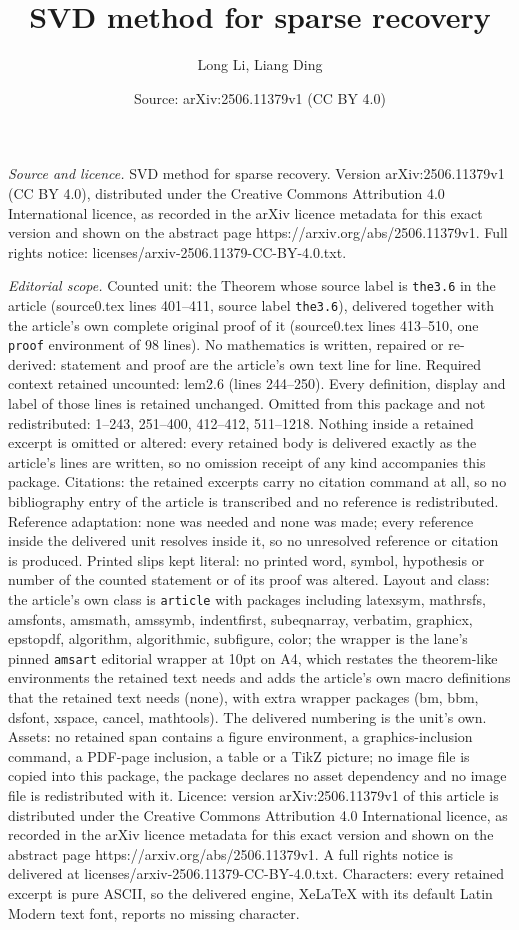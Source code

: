 \documentclass[10pt,a4paper]{amsart}
\title[SVD method for sparse recovery]{SVD method for sparse recovery}
\author{Long Li, Liang Ding}
\date{Source: arXiv:2506.11379v1 (CC BY 4.0)}
\begin{document}
\maketitle

\noindent\emph{Source and licence.} SVD method for sparse recovery. Version arXiv:2506.11379v1 (CC BY 4.0), distributed under the Creative Commons Attribution 4.0 International licence, as recorded in the arXiv licence metadata for this exact version and shown on the abstract page https://arxiv.org/abs/2506.11379v1. Full rights notice: licenses/arxiv-2506.11379-CC-BY-4.0.txt.\par\smallskip

\noindent\textit{Editorial scope.} Counted unit: the Theorem whose source label is \texttt{the3.6} in the article (source0.tex lines 401--411, source label \texttt{the3.6}), delivered together with the article's own complete original proof of it (source0.tex lines 413--510, one \texttt{proof} environment of 98 lines). No mathematics is written, repaired or re-derived: statement and proof are the article's own text line for line. Required context retained uncounted: lem2.6 (lines 244--250). Every definition, display and label of those lines is retained unchanged. Omitted from this package and not redistributed: 1--243, 251--400, 412--412, 511--1218. Nothing inside a retained excerpt is omitted or altered: every retained body is delivered exactly as the article's lines are written, so no omission receipt of any kind accompanies this package. Citations: the retained excerpts carry no citation command at all, so no bibliography entry of the article is transcribed and no reference is redistributed. Reference adaptation: none was needed and none was made; every reference inside the delivered unit resolves inside it, so no unresolved reference or citation is produced. Printed slips kept literal: no printed word, symbol, hypothesis or number of the counted statement or of its proof was altered. Layout and class: the article's own class is \texttt{article} with packages including latexsym, mathrsfs, amsfonts, amsmath, amssymb, indentfirst, subeqnarray, verbatim, graphicx, epstopdf, algorithm, algorithmic, subfigure, color; the wrapper is the lane's pinned \texttt{amsart} editorial wrapper at 10pt on A4, which restates the theorem-like environments the retained text needs and adds the article's own macro definitions that the retained text needs (none), with extra wrapper packages (bm, bbm, dsfont, xspace, cancel, mathtools). The delivered numbering is the unit's own. Assets: no retained span contains a figure environment, a graphics-inclusion command, a PDF-page inclusion, a table or a TikZ picture; no image file is copied into this package, the package declares no asset dependency and no image file is redistributed with it. Licence: version arXiv:2506.11379v1 of this article is distributed under the Creative Commons Attribution 4.0 International licence, as recorded in the arXiv licence metadata for this exact version and shown on the abstract page https://arxiv.org/abs/2506.11379v1. A full rights notice is delivered at licenses/arxiv-2506.11379-CC-BY-4.0.txt. Characters: every retained excerpt is pure ASCII, so the delivered engine, XeLaTeX with its default Latin Modern text font, reports no missing character.
\end{document}

